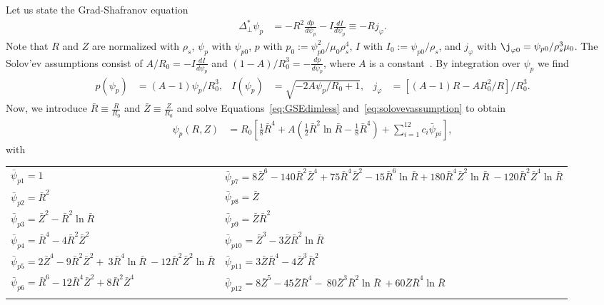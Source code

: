Let us state the Grad-Shafranov equation
\begin{align}\label{eq:GSEdimless}
 \Delta^*_\perp  \psi_p &= -R^2 \frac{d p}{d  \psi_p } - I \frac{d I}{d  \psi_p }\equiv - R j_\varphi.
\end{align}
Note that $R$ and $Z$ are normalized
with $\rho_s$, $\psi_p$ with $\psi_{p0}$, $p$ with
$p_0 := \psi_{p0}^2/\mu_0\rho_s^4$, $I$ with $I_0:=\psi_{p0}/\rho_s$,
and $j_\varphi$ with $\j_{\varphi 0} = \psi_{p0}/\rho_s^3\mu_0$.
The Solov'ev assumptions consist of \(A/R_0 = -I \frac{d I}{d  \psi_p }\) and \((1-A)/R_0^3 = -\frac{d p}{d  \psi_p }\), where \(A\) is a constant~\cite{Cerfon2010,Cerfon2014}.
By integration over \(\psi_p\) we find
\begin{align}\label{eq:solovevassumption}
 p(\psi_p) &= (A-1)\psi_p/R_0^3,  &
 I(\psi_p) &= \sqrt{-2 A \psi_p/R_0 + 1}, &
 j_\varphi &= \left[(A-1)R - A R_0^2 / R\right]/R_0^3.
\end{align}
Now, we introduce \(\bar{R} \equiv \frac{R}{R_0}\) and \(\bar{Z} \equiv\frac{Z}{R_0}\)
and solve Equations~\eqref{eq:GSEdimless} and~\eqref{eq:solovevassumption} to obtain
\begin{align}
 \psi_p (R,Z) &= R_0 \left[ \frac{1}{8}\bar{R}^4 + A\left( \frac{1}{2} \bar{R}^2 \ln{\bar{R}} 
   - \frac{1}{8}\bar{R}^4\right) + \sum_{i=1}^{12} c_{i}  \bar{\psi}_{pi}\right],
\end{align}
with
\begin{longtable}{>{\RaggedRight}p{7cm}>{\RaggedRight}p{7cm}}
\toprule
  $\bar{\psi}_{p1}=1$
  & $\bar{\psi}_{p7}=8\bar{Z}^6 -140 \bar{R}^2 \bar{Z}^4
                      + 75 \bar{R}^4 \bar{Z}^2 - 15\bar{R}^6\ln{\bar{R}}+ 180 \bar{R}^4 \bar{Z}^2 \ln{\bar{R}} \
                       -120 \bar{R}^2 \bar{Z}^4 \ln{\bar{R}}$\\
%
  $\bar{\psi}_{p2}=\bar{R}^2$ &
  $\bar{\psi}_{p8}=\bar{Z}$ \\
%
  $\bar{\psi}_{p3}=\bar{Z}^2 - \bar{R}^2 \ln{\bar{R}}$ &
  $\bar{\psi}_{p9}=\bar{Z}  \bar{R}^2$\\
%
  $\bar{\psi}_{p4}=\bar{R}^4 -4\bar{R}^2\bar{Z}^2$ &
  $\bar{\psi}_{p10}=\bar{Z}^3 - 3 \bar{Z} \bar{R}^2 \ln{\bar{R}}$\\
  $\bar{\psi}_{p5}=2\bar{Z}^4 - 9 \bar{R}^2\bar{Z}^2 + \
                     3 \bar{R}^4 \ln{\bar{R}} \
                    -12  \bar{R}^2\bar{Z}^2 \ln{\bar{R}}$
  &
$\bar{\psi}_{p11}=3 \bar{Z}\bar{R}^4 - 4\bar{Z}^3\bar{R}^2$\\
%
  $\bar{\psi}_{p6}=\bar{R}^6 -12 \bar{R}^4 \bar{Z}^2
                     + 8  \bar{R}^2 \bar{Z}^4$ &
  $\bar{\psi}_{p12}= 8 \bar{Z}^5 -45 \bar{Z} \bar{R}^4 - \
                       80 \bar{Z}^3 \bar{R}^2\ln{\bar{R}} \
                       +60 \bar{Z} \bar{R}^4\ln{\bar{R}}$ \\
   & \\
\bottomrule
\end{longtable}
